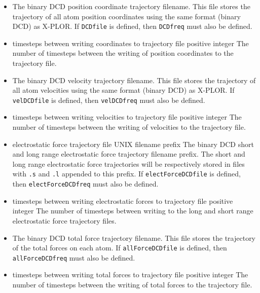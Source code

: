 \begin{itemize}
\item
{}
{
The binary DCD position coordinate trajectory filename.  
This file stores the trajectory of all atom position coordinates 
using the same format (binary DCD) as X-PLOR.  
If \verb!DCDfile! is defined, then \verb!DCDfreq! must also be defined.  
}

\item
{}%
{timesteps between writing coordinates to trajectory file}%
{positive integer}%
{%
The number of timesteps between the writing of position coordinates 
to the trajectory file.  
}

\item
{}
{
The binary DCD velocity trajectory filename.  
This file stores the trajectory of 
all atom velocities using the same format (binary DCD) as X-PLOR.  
If \verb!velDCDfile! is defined, then \verb!velDCDfreq! must also 
be defined.  
}

\item
{}%
{timesteps between writing velocities to trajectory file}%
{positive integer}%
{%
The number of timesteps between the writing of 
velocities to the trajectory file.  
}

\item
{}%
{electrostatic force trajectory file}%
{UNIX filename prefix}%
{%
The binary DCD short and long range electrostatic force 
trajectory filename prefix.  
The short and long range electrostatic force trajectories 
will be respectively stored in files with 
\verb!.s! and \verb!.l! appended to this prefix.  
If \verb!electForceDCDfile! is defined, then \verb!electForceDCDfreq! 
must also be defined.  
}

\item
{}%
{timesteps between writing electrostatic forces to trajectory file}%
{positive integer}%
{%
The number of timesteps between writing 
to the long and short range electrostatic force trajectory files.  
}

\item
{}
{%
The binary DCD total force trajectory filename.  
This file stores the trajectory of the total forces 
on each atom.  
If \verb!allForceDCDfile! is defined, then 
\verb!allForceDCDfreq! must also be defined.  
}

\item
{}%
{timesteps between writing total forces to trajectory file}%
{positive integer}%
{%
The number of timesteps between the writing of total forces 
to the trajectory file.  
}


\end{itemize}

